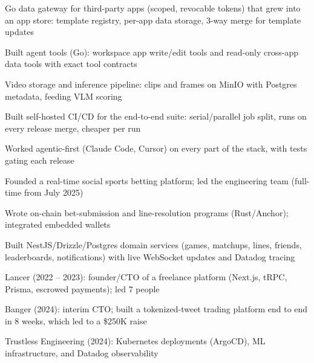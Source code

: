 \documentclass[print]{jack-resume}
\begin{document}
\begin{tightemize}
    \item Go data gateway for third-party apps (scoped, revocable tokens) that grew into an app store: template registry, per-app data storage, 3-way merge for template updates
    \item Built agent tools (Go): workspace app write/edit tools and read-only cross-app data tools with exact tool contracts
    \item Video storage and inference pipeline: clips and frames on MinIO with Postgres metadata, feeding VLM scoring
    \item Built self-hosted CI/CD for the end-to-end suite: serial/parallel job split, runs on every release merge, cheaper per run
    \item Worked agentic-first (Claude Code, Cursor) on every part of the stack, with tests gating each release
\end{tightemize}
\sectionsep

\begin{tightemize}
    \item Founded a real-time social sports betting platform; led the engineering team (full-time from July 2025)
    \item Wrote on-chain bet-submission and line-resolution programs (Rust/Anchor); integrated embedded wallets
    \item Built NestJS/Drizzle/Postgres domain services (games, matchups, lines, friends, leaderboards, notifications) with live WebSocket updates and Datadog tracing
\end{tightemize}
\sectionsep

\begin{tightemize}
    \item Lancer (2022 -- 2023): founder/CTO of a freelance platform (Next.js, tRPC, Prisma, escrowed payments); led 7 people
    \item Banger (2024): interim CTO; built a tokenized-tweet trading platform end to end in 8 weeks, which led to a \$250K raise
    \item Trustless Engineering (2024): Kubernetes deployments (ArgoCD), ML infrastructure, and Datadog observability
\end{tightemize}
\sectionsep
\end{document}
